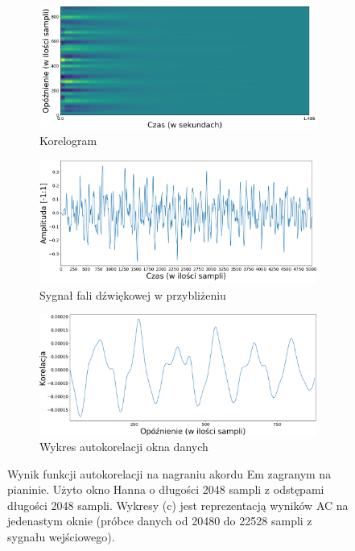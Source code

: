 \documentclass[12pt,a4paper,twoside]{mwart}
\begin{document}
\begin{figure}[ht]
  \begin{subfigure}{1.\textwidth}
    \centering
    \includegraphics[width=.49\linewidth]{images/Em/Corelogram_cropped.png}
    \caption{Korelogram}
  \end{subfigure}
  \newline
  \begin{subfigure}{0.5\textwidth}
    \includegraphics[width=1.\linewidth]{images/Em/waveform_zoom_samples_cropped.png}
    \caption{Sygnał fali dźwiękowej w przybliżeniu}
  \end{subfigure}
  \begin{subfigure}{0.49\textwidth}
    \includegraphics[width=1.\linewidth]{images/Em/corelation_cropped.png}
    \caption{Wykres autokorelacji okna danych}
  \end{subfigure}
  \caption{Wynik funkcji autokorelacji na nagraniu akordu Em zagranym na pianinie. Użyto okno Hanna o długości 2048 sampli z odstępami długości 2048 sampli. Wykresy (c) jest reprezentacją wyników AC na jedenastym oknie (próbce danych od 20480 do 22528 sampli z sygnału wejściowego).}
  \label{fig:multi:ac:em}
\end{figure}
\end{document}
